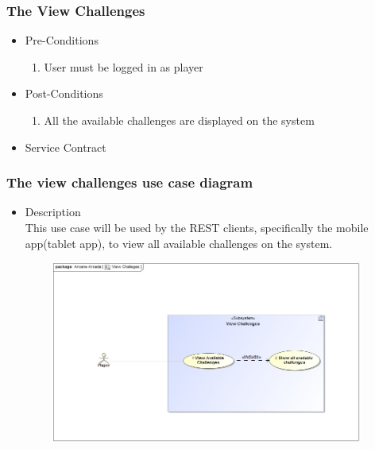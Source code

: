 \documentclass[english]{article}
\begin{document}
		\subsubsection{The View Challenges}
		
			\begin{itemize}
	
		
		\item Pre-Conditions
			\begin{enumerate}
				\item User must be logged in as player
				
			\end{enumerate}
		\item Post-Conditions
			\begin{enumerate}
			\item All the available challenges are displayed on the system
						
			\end{enumerate}
		\item Service Contract
			\begin{figure}
			
			\end{figure}

		\end{itemize}
		
		
		\subsubsection* {The view challenges use case diagram}
		\begin{itemize}
			\item Description\\
			This use case will be used by the REST clients, specifically the mobile app(tablet app), to view all available challenges on the system.
		\end{itemize}
		
	
		\includegraphics[width=14cm,height=6cm,keepaspectratio]{viewChallenges.jpg}
		
\end{document}
